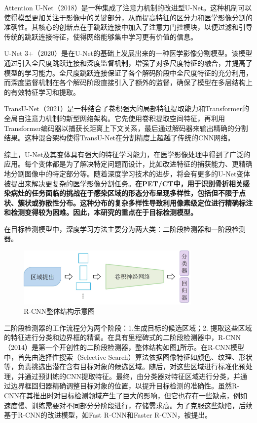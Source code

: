 Attention U-Net\cite{oktay2018attention}（2018）是一种集成了注意力机制的改进型U-Net\cite{ronneberger2015u}。这种机制可以使得模型更加关注于影像中的关键部分，从而提高特征的区分力和医学影像分割的准确性。其核心的创新点在于跳跃连接中加入了注意力门控模块，以便过滤和引导传统的跳跃连接特征，使得网络能够集中学习更有价值的信息。

U-Net 3+\cite{huang2020unet}（2020）是在U-Net的基础上发展出来的一种医学影像分割模型。该模型通过引入全尺度跳跃连接和深度监督机制，增强了对多尺度特征的融合，并提高了模型的学习能力。全尺度跳跃连接保证了各个解码阶段中全尺度特征的充分利用，而深度监督机制在各个解码阶段直接引入了额外的监督，确保了模型在多层结构上的有效特征学习和提取。

TransU-Net\cite{chen2021transunet}（2021）是一种结合了卷积强大的局部特征提取能力和Transformer的全局自注意力机制的新型网络架构。它先使用卷积提取空间特征，再利用Transformer编码器以捕获长距离上下文关系，最后通过解码器来输出精确的分割结果。这种混合架构使得TransU-Net在分割精度上超越了传统的CNN网络。

综上，U-Net及其变体具有强大的特征学习能力，在医学影像处理中得到了广泛的应用。每个变体都是为了解决特定问题而设计，比如改进特征的捕获能力、更精确地分割图像中的特定部分等。随着深度学习技术的进步，将会有更多的U-Net变体被提出来解决更复杂的医学影像分割任务。\textbf{在PET/CT中，用于识别骨折相关感染病灶的任务面临的挑战在于感染区域的形态分布呈现多样性，包括但不限于点状、簇状或弥散性分布。这种分布的复杂多样性导致利用像素级定位进行精确标注和检测变得较为困难。因此，本研究的重点在于目标检测模型。}

在目标检测模型中，深度学习方法主要分为两大类：二阶段检测器和一阶段检测器。

\begin{figure}[htbp]
  \centering
  \includegraphics[width=0.8\textwidth]{figures/chap02_rcnn.jpg}
  \caption{R-CNN整体结构示意图}
  \label{fig:chap02_rcnn}
\end{figure}

二阶段检测器的工作流程分为两个阶段：1.生成目标的候选区域；2. 提取这些区域的特征进行分类和边界框的精调。在具有里程碑式的二阶段检测器中，R-CNN\cite{girshick2014rich}（2014）是第一个开创性的二阶段检测器，整体结构如图\ref{fig:chap02_rcnn}所示。在R-CNN模型中，首先由选择性搜索（Selective Search）算法依据图像特征如颜色、纹理、形状等，负责挑选出潜在含有目标对象的候选区域。随后，对这些区域进行标准化预处理，并通过预训练的CNN提取特征。最终，由分类器对特征区域进行分类，并通过边界框回归器精确调整目标对象的位置，以提升目标检测的准确性。虽然R-CNN在其推出时对目标检测领域产生了巨大的影响，但它也存在一些缺点，例如速度慢、训练需要对不同部分分阶段进行，存储需求高。为了克服这些缺陷，后续基于R-CNN的改进模型，如Fast R-CNN\cite{girshick2015fast}和Faster R-CNN\cite{ren2015faster}，被提出。

